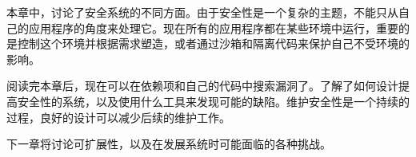 本章中，讨论了安全系统的不同方面。由于安全性是一个复杂的主题，不能只从自己的应用程序的角度来处理它。现在所有的应用程序都在某些环境中运行，重要的是控制这个环境并根据需求塑造，或者通过沙箱和隔离代码来保护自己不受环境的影响。

阅读完本章后，现在可以在依赖项和自己的代码中搜索漏洞了。了解了如何设计提高安全性的系统，以及使用什么工具来发现可能的缺陷。维护安全性是一个持续的过程，良好的设计可以减少后续的维护工作。

下一章将讨论可扩展性，以及在发展系统时可能面临的各种挑战。